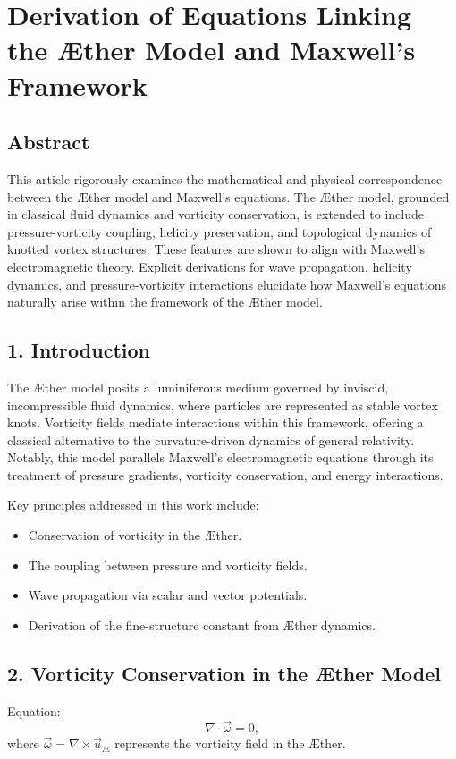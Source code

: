 

        \section{Derivation of Equations Linking the Æther Model and Maxwell's Framework}

        \subsection*{Abstract}
        This article rigorously examines the mathematical and physical correspondence between the Æther model and Maxwell's equations. The Æther model, grounded in classical fluid dynamics and vorticity conservation, is extended to include pressure-vorticity coupling, helicity preservation, and topological dynamics of knotted vortex structures. These features are shown to align with Maxwell's electromagnetic theory. Explicit derivations for wave propagation, helicity dynamics, and pressure-vorticity interactions elucidate how Maxwell's equations naturally arise within the framework of the Æther model.

        \subsection*{1. Introduction}
        The Æther model posits a luminiferous medium governed by inviscid, incompressible fluid dynamics, where particles are represented as stable vortex knots. Vorticity fields mediate interactions within this framework, offering a classical alternative to the curvature-driven dynamics of general relativity. Notably, this model parallels Maxwell's electromagnetic equations through its treatment of pressure gradients, vorticity conservation, and energy interactions.

        Key principles addressed in this work include:
        \begin{itemize}
            \item Conservation of vorticity in the Æther.
            \item The coupling between pressure and vorticity fields.
            \item Wave propagation via scalar and vector potentials.
            \item Derivation of the fine-structure constant from Æther dynamics.
        \end{itemize}

        \subsection*{2. Vorticity Conservation in the Æther Model}
        Equation:
        \begin{equation}
            \nabla \cdot \vec{\omega} = 0,
        \end{equation}
        where $\vec{\omega} = \nabla \times \vec{u}_\text{Æ}$ represents the vorticity field in the Æther.

